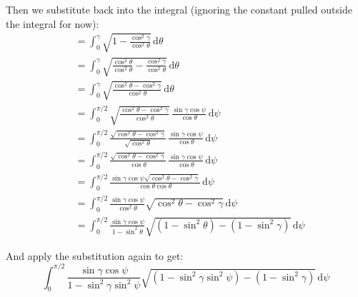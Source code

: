 \documentclass[titlepage]{article}
\begin{document}
Then we substitute back into the integral (ignoring the constant pulled outside the integral for now):
\begin{equation}
	\begin{split}
		&=\int_{0}^{\gamma}\sqrt{1-\frac{\cos^2\gamma}{\cos^2\theta}}\,\mathrm{d}\theta \\
		&=\int_{0}^{\gamma}\sqrt{\frac{\cos^2\theta}{\cos^2\theta}-\frac{\cos^2\gamma}{\cos^2\theta}}\,\mathrm{d}\theta \\
		&=\int_{0}^{\gamma}\sqrt{\frac{\cos^2\theta-\cos^2\gamma}{\cos^2\theta}}\,\mathrm{d}\theta \\
		&=\int_{0}^{\pi/2}\sqrt{\frac{\cos^2\theta-\cos^2\gamma}{\cos^2\theta}}\,\frac{\sin\gamma\cos\psi}{\cos\theta}\,\mathrm{d}\psi \\
		&=\int_{0}^{\pi/2}\frac{\sqrt{\cos^2\theta-\cos^2\gamma}}{\sqrt{\cos^2\theta}}\,\frac{\sin\gamma\cos\psi}{\cos\theta}\,\mathrm{d}\psi \\
		&=\int_{0}^{\pi/2}\frac{\sqrt{\cos^2\theta-\cos^2\gamma}}{\cos\theta}\,\frac{\sin\gamma\cos\psi}{\cos\theta}\,\mathrm{d}\psi \\
		&=\int_{0}^{\pi/2}\frac{\sin\gamma\cos\psi\sqrt{\cos^2\theta-\cos^2\gamma}}{\cos\theta\cos\theta}\,\mathrm{d}\psi \\
		&=\int_{0}^{\pi/2}\frac{\sin\gamma\cos\psi}{\cos^2\theta}\sqrt{\cos^2\theta-\cos^2\gamma}\,\mathrm{d}\psi \\
		&=\int_{0}^{\pi/2}\frac{\sin\gamma\cos\psi}{1-\sin^2\theta}\sqrt{\left(1-\sin^2\theta\right)-\left(1-\sin^2\gamma\right)}\,\mathrm{d}\psi
	\end{split}
\end{equation}

And apply the substitution again to get:
\begin{equation}
	\int_{0}^{\pi/2}\frac{\sin\gamma\cos\psi}{1-\sin^2\gamma\sin^2\psi}\sqrt{\left(1-\sin^2\gamma\sin^2\psi\right)-\left(1-\sin^2\gamma\right)}\,\mathrm{d}\psi
\end{equation}
\end{document}
